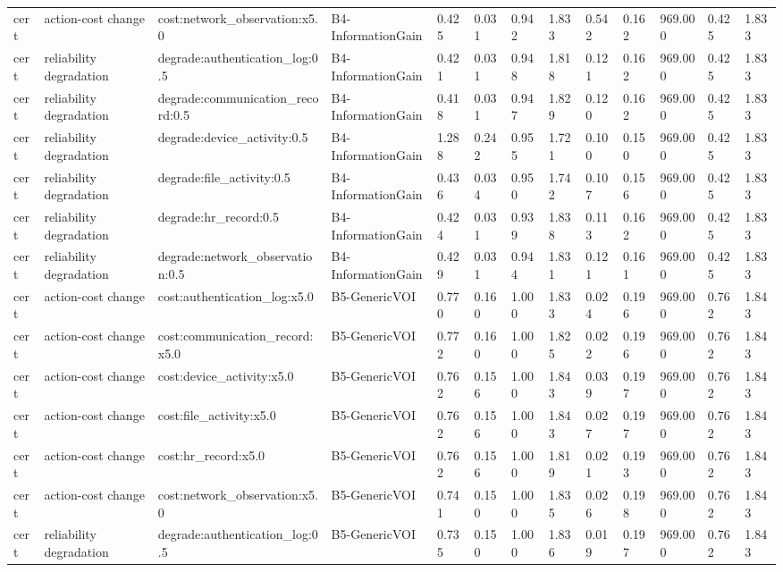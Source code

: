 \begin{table}[!ht]
{\begin{tabular}{lllllllllllll}
cert & action-cost change & cost:network\_observation:x5.0 & B4-InformationGain & 0.425 & 0.031 & 0.942 & 1.833 & 0.542 & 0.162 & 969.000 & 0.425 & 1.833 \\
cert & reliability degradation & degrade:authentication\_log:0.5 & B4-InformationGain & 0.421 & 0.031 & 0.948 & 1.818 & 0.121 & 0.162 & 969.000 & 0.425 & 1.833 \\
cert & reliability degradation & degrade:communication\_record:0.5 & B4-InformationGain & 0.418 & 0.031 & 0.947 & 1.829 & 0.120 & 0.162 & 969.000 & 0.425 & 1.833 \\
cert & reliability degradation & degrade:device\_activity:0.5 & B4-InformationGain & 1.288 & 0.242 & 0.955 & 1.721 & 0.100 & 0.150 & 969.000 & 0.425 & 1.833 \\
cert & reliability degradation & degrade:file\_activity:0.5 & B4-InformationGain & 0.436 & 0.034 & 0.950 & 1.742 & 0.107 & 0.156 & 969.000 & 0.425 & 1.833 \\
cert & reliability degradation & degrade:hr\_record:0.5 & B4-InformationGain & 0.424 & 0.031 & 0.939 & 1.838 & 0.113 & 0.162 & 969.000 & 0.425 & 1.833 \\
cert & reliability degradation & degrade:network\_observation:0.5 & B4-InformationGain & 0.429 & 0.031 & 0.944 & 1.831 & 0.121 & 0.161 & 969.000 & 0.425 & 1.833 \\
cert & action-cost change & cost:authentication\_log:x5.0 & B5-GenericVOI & 0.770 & 0.160 & 1.000 & 1.833 & 0.024 & 0.196 & 969.000 & 0.762 & 1.843 \\
cert & action-cost change & cost:communication\_record:x5.0 & B5-GenericVOI & 0.772 & 0.160 & 1.000 & 1.825 & 0.022 & 0.196 & 969.000 & 0.762 & 1.843 \\
cert & action-cost change & cost:device\_activity:x5.0 & B5-GenericVOI & 0.762 & 0.156 & 1.000 & 1.843 & 0.039 & 0.197 & 969.000 & 0.762 & 1.843 \\
cert & action-cost change & cost:file\_activity:x5.0 & B5-GenericVOI & 0.762 & 0.156 & 1.000 & 1.843 & 0.027 & 0.197 & 969.000 & 0.762 & 1.843 \\
cert & action-cost change & cost:hr\_record:x5.0 & B5-GenericVOI & 0.762 & 0.156 & 1.000 & 1.819 & 0.021 & 0.193 & 969.000 & 0.762 & 1.843 \\
cert & action-cost change & cost:network\_observation:x5.0 & B5-GenericVOI & 0.741 & 0.150 & 1.000 & 1.835 & 0.026 & 0.198 & 969.000 & 0.762 & 1.843 \\
cert & reliability degradation & degrade:authentication\_log:0.5 & B5-GenericVOI & 0.735 & 0.150 & 1.000 & 1.836 & 0.019 & 0.197 & 969.000 & 0.762 & 1.843 \\

\end{tabular}}
\end{table}
